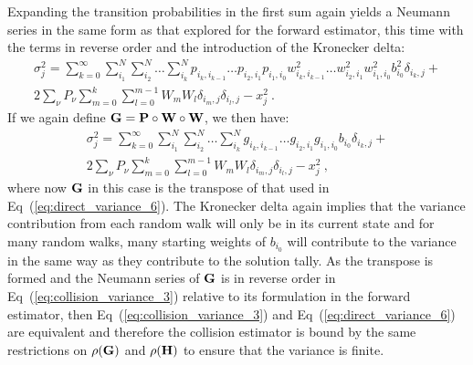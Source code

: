 Expanding the transition probabilities in the first sum again yields a
Neumann series in the same form as that explored for the forward
estimator, this time with the terms in reverse order and the
introduction of the Kronecker delta:
\begin{multline}
  \sigma_j^2 = \sum_{k=0}^{\infty}\sum_{i_1}^{N}\sum_{i_2}^{N}\ldots
  \sum_{i_k}^{N} p_{i_k,i_{k-1}}\ldots p_{i_2,i_1} p_{i_1,i_0}
  w^2_{i_k,i_{k-1}}\ldots w^2_{i_2,i_1} w^2_{i_1,i_0}
  b^2_{i_0}\delta_{i_k,j} + \\ 2 \sum_{\nu} P_{\nu} \sum_{m=0}^k
  \sum_{l=0}^{m-1} W_m W_l \delta_{i_m,j} \delta_{i_l,j} - x_j^2\:.
  \label{eq:collision_variance_2}
\end{multline}
If we again define $\mathbf{G} = \mathbf{P} \circ \mathbf{W} \circ \mathbf{W}$, we
then have:
\begin{multline}
  \sigma^2_j = \sum_{k=0}^{\infty}\sum_{i_1}^{N}\sum_{i_2}^{N}\ldots
  \sum_{i_k}^{N}g_{i_{k},i_{k-1}} \ldots
  g_{i_2,i_1}g_{i_1,i_0}b_{i_0}\delta_{i_k,j} + \\ 2 \sum_{\nu}
  P_{\nu} \sum_{m=0}^k \sum_{l=0}^{m-1} W_m W_l \delta_{i_m,j}
  \delta_{i_l,j} - x_j^2\:,
\label{eq:collision_variance_3}
\end{multline}
where now $\mathbf{G}$ in this case is the transpose of that used in
Eq~(\ref{eq:direct_variance_6}). The Kronecker delta again implies
that the variance contribution from each random walk will only be in
its current state and for many random walks, many starting weights of
$b_{i_0}$ will contribute to the variance in the same way as they
contribute to the solution tally. As the transpose is formed and the
Neumann series of $\mathbf{G}$ is in reverse order in
Eq~(\ref{eq:collision_variance_3}) relative to its formulation in the
forward estimator, then Eq~(\ref{eq:collision_variance_3}) and
Eq~(\ref{eq:direct_variance_6}) are equivalent and therefore the
collision estimator is bound by the same restrictions on
$\rho(\mathbf{G})$ and $\rho(\mathbf{H})$ to ensure that the variance is
finite.


